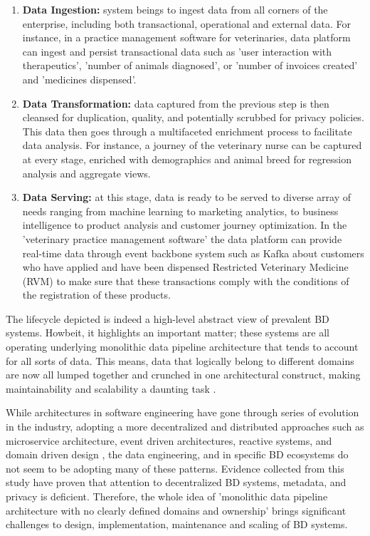 \documentclass[review]{elsarticle}
\begin{document}
\begin{enumerate}
    \item \textbf{Data Ingestion:} system beings to ingest data from all corners of the enterprise, including both transactional, operational and external data. For instance, in a practice management software for veterinaries, data platform can ingest and persist transactional data such as 'user interaction with therapeutics', 'number of animals diagnosed', or 'number of invoices created' and 'medicines dispensed'.
    \item \textbf{Data Transformation:} data captured from the previous step is then cleansed for duplication, quality, and potentially scrubbed for privacy policies. This data then goes through a multifaceted enrichment process to facilitate data analysis. For instance, a journey of the veterinary nurse can be captured at every stage, enriched with demographics and animal breed for regression analysis and aggregate views.
    \item \textbf{Data Serving:} at this stage, data is ready to be served to diverse array of needs ranging from machine learning to marketing analytics, to business intelligence to product analysis and customer journey optimization. In the 'veterinary practice management software' the data platform can provide real-time data through event backbone system such as Kafka  about customers who have applied and have been dispensed Restricted Veterinary Medicine (RVM) to make sure that these transactions comply with the conditions of the registration of these products.
\end{enumerate}

The lifecycle depicted is indeed a high-level abstract view of prevalent BD systems. Howbeit, it highlights an important matter; these systems are all operating underlying monolithic data pipeline architecture that tends to account for all sorts of data. This means, data that logically belong to different domains are now all lumped together and crunched in one architectural construct, making maintainability and scalability a daunting task \cite{monolithToMesh}.

While architectures in software engineering have gone through series of evolution in the industry, adopting a more decentralized and distributed approaches such as microservice architecture, event driven architectures, reactive systems, and domain driven design \cite{alshuqayran2016systematic}, the data engineering, and in specific BD ecosystems do not seem to be adopting many of these patterns. Evidence collected from this study have proven that attention to decentralized BD systems, metadata, and privacy is deficient. Therefore, the whole idea of 'monolithic data pipeline architecture with no clearly defined domains and ownership' brings significant challenges to design, implementation, maintenance and scaling of BD systems. 
\end{document}
